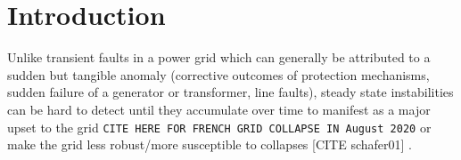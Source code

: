\section[Introduction]{Introduction}

Unlike transient faults in a power grid which can generally be attributed to a sudden but tangible anomaly (corrective outcomes of protection mechanisms, sudden failure of a generator or transformer, line faults), steady state instabilities can be hard to detect until they accumulate over time to manifest as a major upset to the grid \verb|CITE HERE FOR FRENCH GRID COLLAPSE IN August 2020| or make the grid less robust/more susceptible to collapses [CITE schafer01] \cite{schafer01}.

